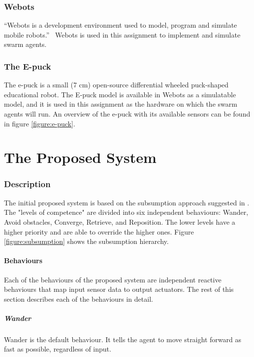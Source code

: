 \documentclass[a4paper]{article}
\begin{document}
\section{Webots}

``Webots is a development environment used to model, program and simulate mobile robots.''~\cite{webots}
Webots is used in this assignment to implement and simulate swarm agents.

\section{The E-puck}

The e-puck is a small (7 cm) open-source differential wheeled puck-shaped educational robot.
The E-puck model is available in Webots as a simulatable model, and it is used in this assignment as the hardware on which the swarm agents will run.
An overview of the e-puck with its available sensors can be found in figure \vref{figure:e-puck}.

\part{The Proposed System}
\label{part:improved-system}

\section{Description}

The initial proposed system is based on the subsumption approach suggested in \cite{assignment}.
The "levels of competence" are divided into six independent behaviours: Wander, Avoid obstacles, Converge, Retrieve, and Reposition.
The lower levels have a higher priority and are able to override the higher ones.
Figure \vref{figure:subsumption} shows the subsumption hierarchy.



\subsection{Behaviours}
Each of the behaviours of the proposed system are independent reactive behaviours that map input sensor data to output actuators. The rest of this section describes each of the behaviours in detail.

\subsubsection{Wander}
Wander is the default behaviour.
It tells the agent to move straight forward as fast as possible, regardless of input.
\end{document}
